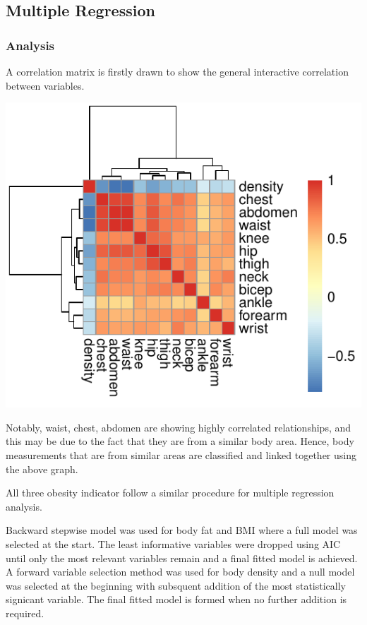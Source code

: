 \documentclass[a4paper,9pt,twocolumn,twoside,]{pinp}
\begin{document}
\hypertarget{multiple-regression}{%
\subsection{Multiple Regression}\label{multiple-regression}}

\hypertarget{analysis-1}{%
\subsubsection{Analysis}\label{analysis-1}}

A correlation matrix is firstly drawn to show the general interactive
correlation between variables.

\begin{center}\includegraphics{Executive-Report_files/figure-latex/unnamed-chunk-1-1} \end{center}

Notably, waist, chest, abdomen are showing highly correlated
relationships, and this may be due to the fact that they are from a
similar body area. Hence, body measurements that are from similar areas
are classified and linked together using the above graph.

All three obesity indicator follow a similar procedure for multiple
regression analysis.

Backward stepwise model was used for body fat and BMI where a full model
was selected at the start. The least informative variables were dropped
using AIC until only the most relevant variables remain and a final
fitted model is achieved. A forward variable selection method was used
for body density and a null model was selected at the beginning with
subsquent addition of the most statistically signicant variable. The
final fitted model is formed when no further addition is required.
\end{document}
